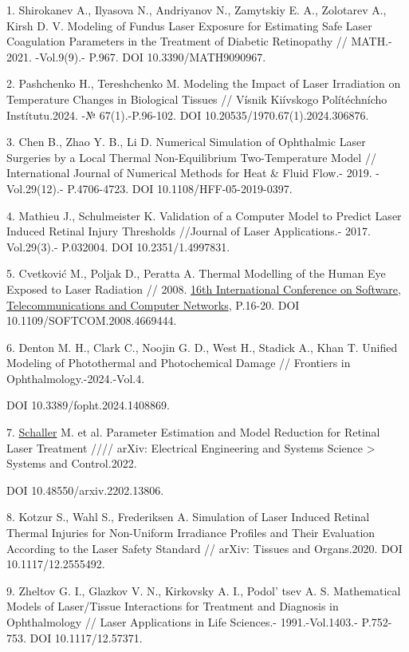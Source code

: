 \begin{references}
1. Shirokanev A., Ilyasova N., Andriyanov N., Zamytskiy E. A., Zolotarev
A., Kirsh D. V. Modeling of Fundus Laser Exposure for Estimating Safe
Laser Coagulation Parameters in the Treatment of Diabetic Retinopathy //
MATH.- 2021. -Vol.9(9).- P.967. DOI 10.3390/MATH9090967.

2. Pashchenko H., Tereshchenko M. Modeling the Impact of Laser
Irradiation on Temperature Changes in Biological Tissues // Vísnik
Kiívskogo Polítéchnícho Instítutu.2024. -№ 67(1).-P.96-102. DOI
10.20535/1970.67(1).2024.306876.

3. Chen B., Zhao Y. B., Li D. Numerical Simulation of Ophthalmic Laser
Surgeries by a Local Thermal Non-Equilibrium Two-Temperature Model //
International Journal of Numerical Methods for Heat \& Fluid Flow.-
2019. - Vol.29(12).- P.4706-4723. DOI 10.1108/HFF-05-2019-0397.

4. Mathieu J., Schulmeister K. Validation of a Computer Model to Predict
Laser Induced Retinal Injury Thresholds //Journal of Laser
Applications.- 2017. Vol.29(3).- P.032004. DOI 10.2351/1.4997831.

5. Cvetković M., Poljak D., Peratta A. Thermal Modelling of the Human Eye
Exposed to Laser Radiation // 2008.
\href{https://ieeexplore.ieee.org/xpl/conhome/4662489/proceeding}{16th
International Conference on Software, Telecommunications and Computer
Networks}, P.16-20. DOI 10.1109/SOFTCOM.2008.4669444.

6. Denton M. H., Clark C., Noojin G. D., West H., Stadick A., Khan T.
Unified Modeling of Photothermal and Photochemical Damage // Frontiers
in Ophthalmology.-2024.-Vol.4.

DOI 10.3389/fopht.2024.1408869.

7. \href{https://www.researchgate.net/profile/Manuel-Schaller-2?_tp=eyJjb250ZXh0Ijp7ImZpcnN0UGFnZSI6InB1YmxpY2F0aW9uIiwicGFnZSI6InB1YmxpY2F0aW9uIn19}{Schaller}
M. et al. Parameter Estimation and Model Reduction for Retinal Laser
Treatment //// arXiv: Electrical Engineering and Systems Science
\textgreater{} Systems and Control.2022.

DOI 10.48550/arxiv.2202.13806.

8. Kotzur S., Wahl S., Frederiksen A. Simulation of Laser Induced Retinal
Thermal Injuries for Non-Uniform Irradiance Profiles and Their
Evaluation According to the Laser Safety Standard // arXiv: Tissues and
Organs.2020. DOI 10.1117/12.2555492.

9. Zheltov G. I., Glazkov V. N., Kirkovsky A. I.,
Podol' tsev A. S. Mathematical Models of Laser/Tissue
Interactions for Treatment and Diagnosis in Ophthalmology // Laser
Applications in Life Sciences.- 1991.-Vol.1403.- P.752-753. DOI
10.1117/12.57371.


\end{references}
